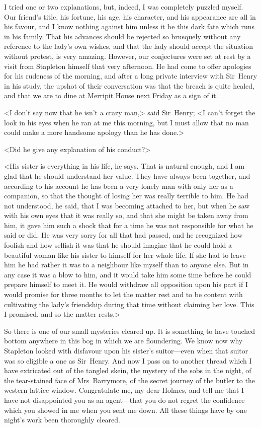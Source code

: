 I tried one or two explanations, but, indeed, I was completely puzzled myself. Our friend's title, his fortune, his age, his character, and his appearance are all in his favour, and I know nothing against him unless it be this dark fate which runs in his family. That his advances should be rejected so brusquely without any reference to the lady's own wishes, and that the lady should accept the situation without protest, is very amazing. However, our conjectures were set at rest by a visit from Stapleton himself that very afternoon. He had come to offer apologies for his rudeness of the morning, and after a long private interview with Sir~Henry in his study, the upshot of their conversation was that the breach is quite healed, and that we are to dine at Merripit House next Friday as a sign of it.

<I don't say now that he isn't a crazy man,> said Sir~Henry; <I can't forget the look in his eyes when he ran at me this morning, but I must allow that no man could make a more handsome apology than he has done.>

<Did he give any explanation of his conduct?>

<His sister is everything in his life, he says. That is natural e\-nough, and I am glad that he should understand her value. They have always been together, and according to his account he has been a very lonely man with only her as a companion, so that the thought of losing her was really terrible to him. He had not understood, he said, that I was becoming attached to her, but when he saw with his own eyes that it was really so, and that she might be taken away from him, it gave him such a shock that for a time he was not responsible for what he said or did. He was very sorry for all that had passed, and he recognized how foolish and how selfish it was that he should imagine that he could hold a beautiful woman like his sister to himself for her whole life. If she had to leave him he had rather it was to a neighbour like myself than to anyone else. But in any case it was a blow to him, and it would take him some time before he could prepare himself to meet it. He would withdraw all opposition upon his part if I would promise for three months to let the matter rest and to be content with cultivating the lady's friendship during that time without claiming her love. This I promised, and so the matter rests.>

So there is one of our small mysteries cleared up. It is something to have touched bottom anywhere in this bog in which we are floundering. We know now why Stapleton looked with disfavour upon his sister's suitor—even when that suitor was so eligible a one as Sir~Henry. And now I pass on to another thread which I have extricated out of the tangled skein, the mystery of the sobs in the night, of the tear-stained face of Mrs~Barrymore, of the secret journey of the butler to the western lattice window. Congratulate me, my dear Holmes, and tell me that I have not disappointed you as an agent—that you do not regret the confidence which you showed in me when you sent me down. All these things have by one night's work been thoroughly cleared.

